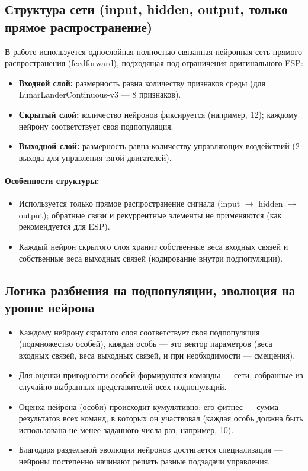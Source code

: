 \documentclass[a4paper,12pt]{article}
\begin{document}
\subsection{Структура сети (input, hidden, output, только прямое распространение)}
В работе используется однослойная полностью связанная нейронная сеть прямого распространения (feedforward), подходящая под ограничения оригинального ESP:
\begin{itemize}
	\item \textbf{Входной слой:} размерность равна количеству признаков среды (для LunarLanderContinuous-v3 --- 8 признаков).
	\item \textbf{Скрытый слой:} количество нейронов фиксируется (например, 12); каждому нейрону соответствует своя подпопуляция.
	\item \textbf{Выходной слой:} размерность равна количеству управляющих воздействий (2 выхода для управления тягой двигателей).
\end{itemize}

\paragraph{Особенности структуры:}
\begin{itemize}
	\item Используется только прямое распространение сигнала (input $\rightarrow$ hidden $\rightarrow$ output); обратные связи и рекуррентные элементы не применяются (как рекомендуется для ESP).
	\item Каждый нейрон скрытого слоя хранит собственные веса входных связей и собственные веса выходных связей (кодирование внутри подпопуляции).
\end{itemize}

\subsection{Логика разбиения на подпопуляции, эволюция на уровне нейрона}
\begin{itemize}
	\item Каждому нейрону скрытого слоя соответствует своя подпопуляция (подмножество особей), каждая особь --- это вектор параметров (веса входных связей, веса выходных связей, и при необходимости --- смещения).
	\item Для оценки пригодности особей формируются команды --- сети, собранные из случайно выбранных представителей всех подпопуляций.
	\item Оценка нейрона (особи) происходит кумулятивно: его фитнес --- сумма результатов всех команд, в которых он участвовал (каждая особь должна быть использована не менее заданного числа раз, например, 10).
	\item Благодаря раздельной эволюции нейронов достигается специализация --- нейроны постепенно начинают решать разные подзадачи управления.
\end{itemize}
\end{document}
